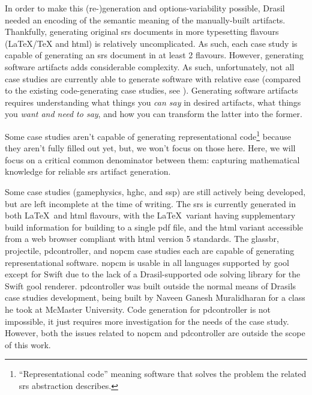 In order to make this (re-)generation and options-variability possible, Drasil
needed an encoding of the semantic meaning of the manually-built artifacts.
Thankfully, generating original \acs{srs} documents in more typesetting flavours
(\LaTeX{}/\TeX{} and \acs{html}) is relatively uncomplicated. As such, each case
study is capable of generating an \acs{srs} document in at least 2 flavours.
However, generating software artifacts adds considerable complexity. As such,
unfortunately, not all case studies are currently able to generate software with
relative ease (compared to the existing code-generating case studies, see
). Generating software artifacts requires
understanding what things you \textit{can say} in desired artifacts, what things
you \textit{want and need to say}, and how you can transform the latter into the
former.

\caseStudiesCodeTable{}

Some case studies aren't capable of generating representational
code\footnote{``Representational code'' meaning software that solves the problem
      the related \acs{srs} abstraction describes.} because they aren't fully filled
out yet, but, we won't focus on those here. Here, we will focus on a critical
common denominator between them: capturing mathematical knowledge for reliable
\acs{srs} artifact generation.


Some case studies (\acs{gamephysics}, \acs{hghc}, and \acs{ssp}) are still
actively being developed, but are left incomplete at the time of writing. The
\acs{srs} is currently generated in both \LaTeX{}\ and \acs{html} flavours, with
the \LaTeX{}\ variant having supplementary build information for building to a
single \acs{pdf} file, and the \acs{html} variant accessible from a web browser
compliant with \acs{html} version 5 standards. The \acs{glassbr},
\acs{projectile}, \acs{pdcontroller}, and \acs{nopcm} case studies each are
capable of generating representational software. \acs{nopcm} is usable in all
languages supported by \acs{gool} except for Swift due to the lack of a
Drasil-supported \acs{ode} solving library for the Swift \acs{gool} renderer.
\acs{pdcontroller} was built outside the normal means of Drasils case studies
development, being built by Naveen Ganesh Muralidharan \cite{DrasilPR2289Naveen}
for a class he took at McMaster University. Code generation for
\acs{pdcontroller} is not impossible, it just requires more investigation for
the needs of the case study. However, both the issues related to \acs{nopcm} and
\acs{pdcontroller} are outside the scope of this work.

